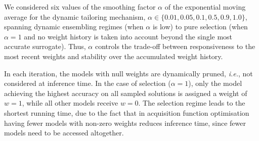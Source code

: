 We considered six values of the smoothing factor $\alpha$ of the exponential moving average for the dynamic tailoring mechanism,  $\alpha\in\{0.01,0.05,0.1,0.5,0.9,1.0\}$,
spanning dynamic ensembling regimes (when $\alpha$ is low) to pure selection (when $\alpha=1$ and no weight history is taken into account beyond the single most accurate surrogate).
Thus, $\alpha$ controls the trade-off between responsiveness to the most recent weights and stability over the accumulated weight history.

In each iteration, the models with null weights are dynamically pruned, \emph{i.e.}, not considered at inference time. In the case of selection ($\alpha=1$), only the model achieving the highest accuracy on all sampled solutions is assigned a weight of $w=1$, while all other models receive $w=0$. 
The selection regime leads to the shortest running time, due to the fact that in acquisition function optimisation having fewer models with non-zero weights reduces inference time, since fewer models need to be accessed altogether.

